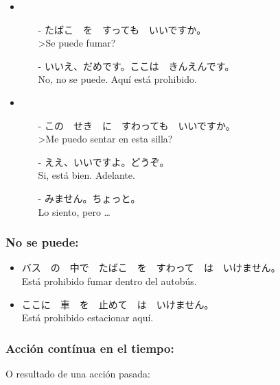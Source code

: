 \documentclass[a4paper,12pt,oneside]{report}
\def\bv{\textbf{V}} %
\begin{document}
\begin{CJK*}{UTF8}{min}
        \begin{itemize}
          \item
            \begin{itemize}
              \item[-] たばこ　を　すっても　いいですか。\\
                       >Se puede fumar?
              \item[-] いいえ、だめです。ここは　きんえんです。\\
                       No, no se puede. Aqu\'i est\'a prohibido.
            \end{itemize}
          \item
            \begin{itemize}
              \item[-] この　せき　に　すわっても　いいですか。\\
                       >Me puedo sentar en esta silla?
              \item[-] ええ、いいですよ。どうぞ。\\
                       Si, est\'a bien. Adelante.
              \item[-] みません。ちょっと。\\
                       Lo siento, pero \ldots
            \end{itemize}
        \end{itemize}

      \subsubsection{No se puede:}
        \fbox{\bv(て) は　いけません}

        \begin{itemize}
          \item バス　の　中で　たばこ　を　すわって　は　いけません。\\
                Est\'a prohibido fumar dentro del autob\'us.
          \item ここに　車　を　止めて　は　いけません。\\
                Est\'a prohibido estacionar aqu\'i.
        \end{itemize}

      \subsubsection{Acci\'on cont\'inua en el tiempo:}
        O resultado de una acci\'on pasada:\\


\end{CJK*}
\end{document}
